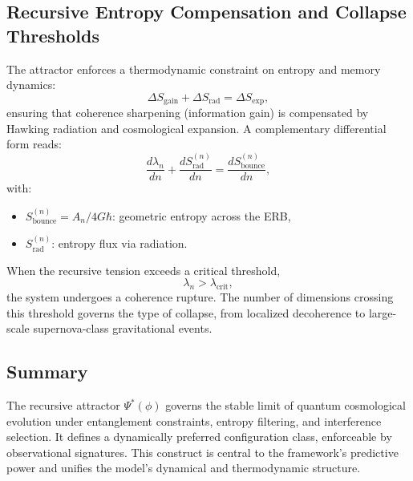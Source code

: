 \subsection{Recursive Entropy Compensation and Collapse Thresholds}

The attractor enforces a thermodynamic constraint on entropy and memory dynamics:
\[
\Delta S_{\text{gain}} + \Delta S_{\text{rad}} = \Delta S_{\text{exp}},
\]
ensuring that coherence sharpening (information gain) is compensated by Hawking radiation and cosmological expansion. A complementary differential form reads:
\[
\frac{d\lambda_n}{dn} + \frac{dS_{\text{rad}}^{(n)}}{dn} = \frac{dS_{\text{bounce}}^{(n)}}{dn},
\]
with:
\begin{itemize}
    \item \( S_{\text{bounce}}^{(n)} = A_n / 4G\hbar \): geometric entropy across the ERB,
    \item \( S_{\text{rad}}^{(n)} \): entropy flux via radiation.
\end{itemize}

When the recursive tension exceeds a critical threshold,
\[
\lambda_n > \lambda_{\text{crit}},
\]
the system undergoes a coherence rupture. The number of dimensions crossing this threshold governs the type of collapse, from localized decoherence to large-scale supernova-class gravitational events.

\subsection{Summary}

The recursive attractor \( \Psi^*(\phi) \) governs the stable limit of quantum cosmological evolution under entanglement constraints, entropy filtering, and interference selection. It defines a dynamically preferred configuration class, enforceable by observational signatures. This construct is central to the framework’s predictive power and unifies the model’s dynamical and thermodynamic structure.

